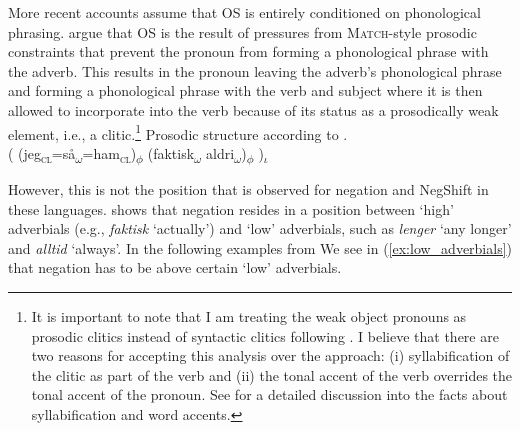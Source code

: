 \documentclass[12pt, letterpaper]{article}
\newcommand{\sub}[1]{\textsubscript{#1}}
\begin{document}
More recent accounts \citep[e.g.,][]{erteschik-shirVariationMainlandScandinavian2020,brinkerhoffMATCHINGPhrasesNorwegian2021} assume that OS is entirely conditioned on phonological phrasing. \citet{brinkerhoffMATCHINGPhrasesNorwegian2021} argue that OS is the result of pressures from \textsc{Match}-style prosodic constraints \citep{selkirkClauseIntonationalPhrase2009,selkirkSyntaxPhonologyInterface2011} that prevent the pronoun from forming a phonological phrase with the adverb. This results in the pronoun leaving the adverb's phonological phrase and forming a phonological phrase with the verb and subject where it is then allowed to incorporate into the verb because of its status as a prosodically weak element, i.e., a clitic.\footnote{It is important to note that I am treating the weak object pronouns as prosodic clitics instead of syntactic clitics following \citet{cardinalettiTypologyStructuralDeficiency1999}. I believe that there are two reasons for accepting this analysis over the \citeauthor{cardinalettiTypologyStructuralDeficiency1999} approach: (i) syllabification of the clitic as part of the verb and (ii) the tonal accent of the verb overrides the tonal accent of the pronoun. See \citet{myrbergProsodicWordSwedish2013,myrbergProsodicHierarchySwedish2015,riadPhonologySwedish2014} for a detailed discussion into the facts about syllabification and word accents. } 
\newline
\ea Prosodic structure according to \citet{brinkerhoffMATCHINGPhrasesNorwegian2021}.\\
( (jeg\sub{\textsc{cl}}=så\sub{$\omega$}=ham\sub{\textsc{cl}})\sub{$\phi$} (faktisk\sub{$\omega$} aldri\sub{$\omega$})\sub{$\phi$} )\sub{$\iota$}
\z 

However, this is not the position that is observed for negation and NegShift in these languages. \citet{nilsenAdverbsAshift1997} shows that negation resides in a position between `high' adverbials (e.g., \emph{faktisk} `actually') and `low' adverbials, such as \emph{lenger} `any longer' and \emph{alltid} `always'. In the following examples from \citet{nilsenAdverbsAshift1997} We see in (\ref{ex:low_adverbials}) that negation has to be above certain `low' adverbials.
\end{document}

